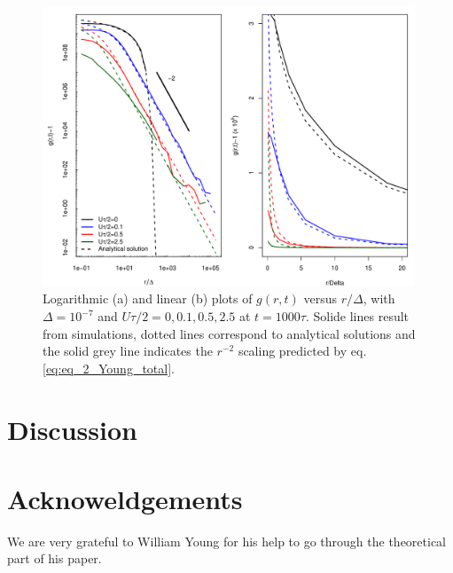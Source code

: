 \begin{figure}[H]
\begin{center}
 \includegraphics[width=0.99\textwidth]{../code/figure/pcf_per_Utot_dx10m8.pdf}
 \caption{Logarithmic (a) and linear (b) plots of $g(r,t)$ versus $r/\Delta$, with $\Delta=10^{-7}$ and $U\tau/2=0,0.1,0.5,2.5$ at $t=1000\tau$. Solide lines result from simulations, dotted lines correspond to analytical solutions and the solid grey line indicates the $r^{-2}$ scaling predicted by eq. \ref{eq:eq_2_Young_total}.}
  \label{fig:pcf_Fig3}
\end{center}
  \end{figure} 
 
\section*{Discussion}


\section*{Acknoweldgements}
We are very grateful to William Young for his help to go through the theoretical part of his paper. 
